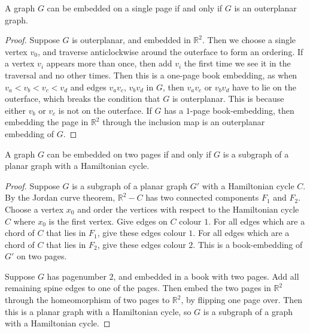 \begin{lemma}\label{lem:Pagenumber_1}
	A graph \(G\) can be embedded on a single page if and only if \(G\) is an outerplanar graph.
\end{lemma}
\begin{proof}
	Suppose $G$ is outerplanar, and embedded in $\mathbb{R}^2$. Then we choose a single vertex $v_0$, and traverse anticlockwise around the outerface to form an ordering. If a vertex $v_i$ appears more than once, then add $v_i$ the first time we see it in the traversal and no other times. Then this is a one-page book embedding, as when $v_a < v_b < v_c < v_d$ and edges $v_a v_c$, $v_b v_d$ in $G$, then $v_a v_c$ or $v_b v_d$ have to lie on the outerface, which breaks the condition that $G$ is outerplanar. This is because either $v_b$ or $v_c$ is not on the outerface. If $G$ has a $1$-page book-embedding, then embedding the page in $\mathbb{R}^2$ through the inclusion map is an outerplanar embedding of $G$. 
\end{proof}
\begin{lemma}\label{lem:Pagenumber_2}
	A graph \(G\) can be embedded on two pages if and only if \(G\) is a subgraph of a planar graph with a Hamiltonian cycle.
\end{lemma}

\begin{proof}
	Suppose $G$ is a subgraph of a planar graph $G'$ with a Hamiltonian cycle $C$. By the Jordan curve theorem, $\mathbb{R}^2 - C$ has two connected components $F_1$ and $F_2$. Choose a vertex $x_0$ and order the vertices with respect to the Hamiltonian cycle $C$ where $x_0$ is the first vertex. Give edges on $C$ colour $1$. For all edges which are a chord of $C$ that lies in $F_1$, give these edges colour $1$. For all edges which are a chord of $C$ that lies in $F_2$, give these edges colour $2$. This is a book-embedding of $G'$ on two pages. 
	\par
	Suppose $G$ has pagenumber $2$, and embedded in a book with two pages. Add all remaining spine edges to one of the pages. Then embed the two pages in $\mathbb{R}^2$ through the homeomorphism of two pages to $\mathbb{R}^2$, by flipping one page over. Then this is a planar graph with a Hamiltonian cycle, so $G$ is a subgraph of a graph with a Hamiltonian cycle.
\end{proof}
